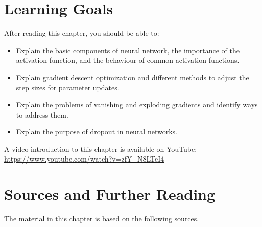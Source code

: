 %
%
\section*{Learning Goals}

After reading this chapter, you should be able to:
\begin{itemize}
   \item Explain the basic components of neural network, the importance of the activation function, and the behaviour of common activation functions.
   \item Explain gradient descent optimization and different methods to adjust the step sizes for parameter updates.
   \item Explain the problems of vanishing and exploding gradients and identify ways to address them.
   \item Explain the purpose of dropout in neural networks.
\end{itemize}

\begin{advanced}
\begin{videobox}
A video introduction to this chapter is available on YouTube:\\

\url{https://www.youtube.com/watch?v=zfY_N8LTeI4}
\end{videobox}
\end{advanced}


\clearpage
\section*{Sources and Further Reading}

The material in this chapter is based on the following sources. 

